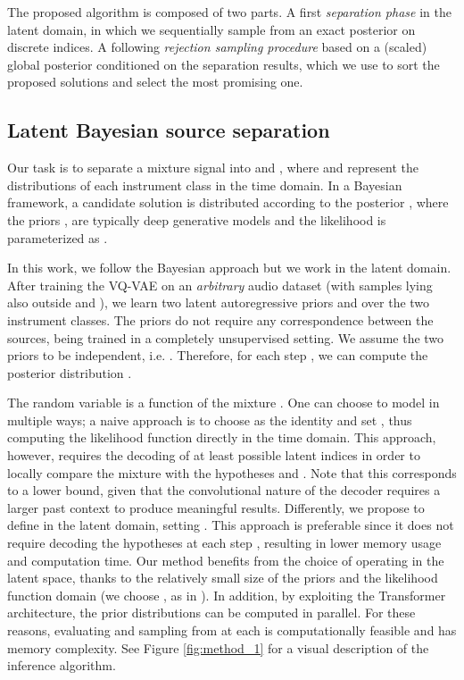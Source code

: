 \documentclass[a4paper]{article}
\begin{document}
The proposed algorithm is composed of two parts. A first \emph{separation phase} in the latent domain, in which we sequentially sample from an exact posterior  on discrete indices.
A following \emph{rejection sampling procedure} based on a (scaled) global posterior conditioned on the separation results, which we use to sort the proposed solutions and select the most promising one.

\subsection{Latent Bayesian source separation}
     Our task is to separate a mixture signal  into  and , where  and  represent the distributions of each instrument class in the time domain. In a Bayesian framework, a candidate solution  is distributed according to the posterior , where the priors ,  are typically deep generative models and the likelihood  is parameterized as .
     
     In this work, we follow the Bayesian approach but we work in the latent domain.
     After training the VQ-VAE on an {\em arbitrary} audio dataset (with samples lying also outside  and ), we learn two latent autoregressive priors  and  over the two instrument classes. The priors do not require any correspondence between the sources, being trained in a completely unsupervised setting. We assume the two priors to be independent, i.e. . Therefore, for each step , we can compute the posterior distribution 
          .
          
          The random variable  is a function of the mixture .
One can choose to model  in multiple ways; a naive approach is to choose  as the identity and set , thus computing  the likelihood function directly in the time domain. This approach, however, requires the  decoding of at least  possible latent indices in order to locally compare the mixture  with the hypotheses  and . Note that this corresponds to a lower bound, given that the convolutional nature of the decoder requires a larger past context to produce meaningful results. Differently, we propose to define  in the latent domain, setting . This approach is preferable since it does not require decoding the hypotheses at each step , resulting in lower memory usage and computation time.
Our method benefits from the choice of operating in the latent space, thanks to the relatively small size of the priors and the likelihood function domain (we choose , as in \cite{dhariwal:2020}). 
          In addition, by exploiting the Transformer architecture, the prior distributions can be computed in parallel. For these reasons, evaluating and sampling from   at each  is computationally feasible and has  memory complexity. See Figure \ref{fig:method_1} for a visual description of the inference algorithm.
 
\end{document}
